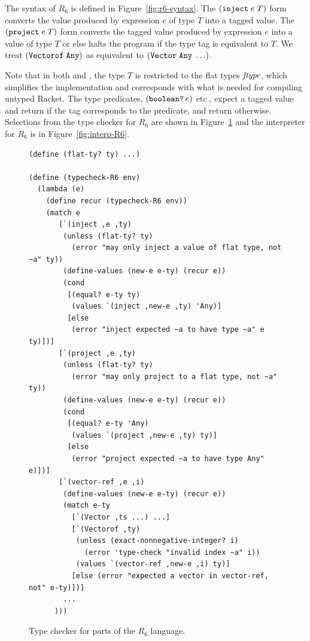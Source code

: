 \documentclass[11pt]{book}
\begin{document}
The syntax of $R_6$ is defined in Figure~\ref{fig:r6-syntax}.  The
$(\texttt{inject}\; e\; T)$ form converts the value produced by
expression $e$ of type $T$ into a tagged value.  The
$(\texttt{project}\;e\;T)$ form converts the tagged value produced by
expression $e$ into a value of type $T$ or else halts the program if
the type tag is equivalent to $T$. We treat
$(\texttt{Vectorof}\;\texttt{Any})$ as equivalent to
$(\texttt{Vector}\;\texttt{Any}\;\ldots)$.

Note that in both  and
, the type $T$ is restricted to the flat types $\mathit{ftype}$,
which simplifies the implementation and corresponds with what is
needed for compiling untyped Racket. The type predicates,
$(\texttt{boolean?}\,e)$ etc., expect a tagged value and return 
if the tag corresponds to the predicate, and return 
otherwise.
%
Selections from the type checker for $R_6$ are shown in
Figure~\ref{fig:typecheck-R6} and the interpreter for $R_6$ is in
Figure~\ref{fig:interp-R6}.

\begin{figure}[btp]
\begin{lstlisting}[basicstyle=\ttfamily\footnotesize]
(define (flat-ty? ty) ...)

(define (typecheck-R6 env)
  (lambda (e)
    (define recur (typecheck-R6 env))
    (match e
       [`(inject ,e ,ty)
        (unless (flat-ty? ty)
          (error "may only inject a value of flat type, not ~a" ty))
        (define-values (new-e e-ty) (recur e))
        (cond
         [(equal? e-ty ty)
          (values `(inject ,new-e ,ty) 'Any)]
         [else
          (error "inject expected ~a to have type ~a" e ty)])]
       [`(project ,e ,ty)
        (unless (flat-ty? ty)
          (error "may only project to a flat type, not ~a" ty))
        (define-values (new-e e-ty) (recur e))
        (cond
         [(equal? e-ty 'Any)
          (values `(project ,new-e ,ty) ty)]
         [else
          (error "project expected ~a to have type Any" e)])]
       [`(vector-ref ,e ,i)
        (define-values (new-e e-ty) (recur e))
        (match e-ty
          [`(Vector ,ts ...) ...]
          [`(Vectorof ,ty)
           (unless (exact-nonnegative-integer? i)
             (error 'type-check "invalid index ~a" i))
           (values `(vector-ref ,new-e ,i) ty)]
          [else (error "expected a vector in vector-ref, not" e-ty)])]
        ...
      )))
\end{lstlisting}
\caption{Type checker for parts of the $R_6$ language.}
\label{fig:typecheck-R6}
\end{figure}
\end{document}

